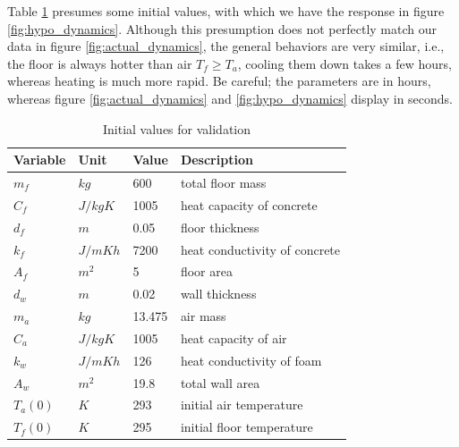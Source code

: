 \documentclass[../main.tex]{subfiles}
\begin{document}
Table \ref{tab:init_values} presumes some initial values, with which we have the response in figure \ref{fig:hypo_dynamics}. Although this presumption does not perfectly match our data in figure \ref{fig:actual_dynamics}, the general behaviors are very similar, i.e., the floor is always hotter than air $T_f \geq T_a$, cooling them down takes a few hours, whereas heating is much more rapid. Be careful; the parameters are in hours, whereas figure \ref{fig:actual_dynamics} and \ref{fig:hypo_dynamics} display in seconds.
\begin{table}[htb]
\caption{Initial values for validation}
\label{tab:init_values}
\centering
    \begin{tabular}{|l|l|l|l|}
    \hline
    \textbf{Variable} & \textbf{Unit} & \textbf{Value} & \textbf{Description} \\ \hline
    \hline
    $m_f$ & $kg$ & 600 & total floor mass \\ \hline
    $C_f$ & $J/kgK$ & 1005 & heat capacity of concrete \\ \hline
    $d_f$ & $m$ & 0.05 & floor thickness \\ \hline
    $k_f$ & $J/mKh$ & 7200 & heat conductivity of concrete \\ \hline
    $A_f$ & $m^2$ & 5 & floor area \\ \hline
    $d_w$ & $m$ & 0.02 & wall thickness \\ \hline
    $m_a$ & $kg$ & 13.475 & air mass \\ \hline
    $C_a$ & $J/kgK$ & 1005 & heat capacity of air \\ \hline
    $k_w$ & $J/mKh$ & 126 & heat conductivity of foam \\ \hline
    $A_w$ & $m^2$ & 19.8 & total wall area \\ \hline
    $T_a(0)$ & $K$ & 293 & initial air temperature \\ \hline
    $T_f(0)$ & $K$ & 295 & initial floor temperature \\ \hline
    \end{tabular}
\end{table}
\end{document}
